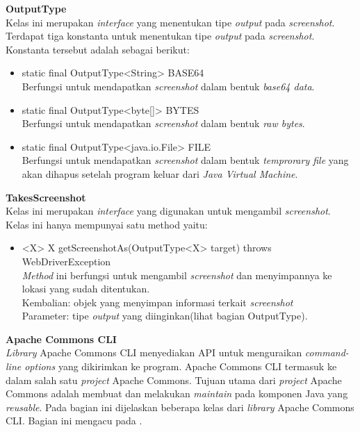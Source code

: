 \documentclass[a4paper,twoside]{article}
\begin{document}
\begin{enumerate}
\textbf{OutputType}\\
Kelas ini merupakan \textit{interface} yang menentukan tipe \textit{output} pada \textit{screenshot}. Terdapat tiga konstanta untuk menentukan tipe \textit{output} pada \textit{screenshot}. Konstanta tersebut adalah sebagai berikut:
\begin{itemize}
\item static final OutputType<String> BASE64\\
Berfungsi untuk mendapatkan \textit{screenshot} dalam bentuk \textit{base64 data}.
\item static final OutputType<byte[]> BYTES\\
Berfungsi untuk mendapatkan \textit{screenshot} dalam bentuk \textit{raw bytes}.
\item static final OutputType<java.io.File> FILE\\
Berfungsi untuk mendapatkan \textit{screenshot} dalam bentuk \textit{temprorary file} yang akan dihapus setelah program keluar dari \textit{Java Virtual Machine}.
\end{itemize}


\textbf{TakesScreenshot}\\
Kelas ini merupakan \textit{interface} yang digunakan untuk mengambil \textit{screenshot}. Kelas ini hanya mempunyai satu method yaitu:
\begin{itemize}
\item <X> X getScreenshotAs(OutputType<X> target) throws WebDriverException\\
\textit{Method} ini berfungsi untuk mengambil \textit{screenshot} dan menyimpannya ke lokasi yang sudah ditentukan.\\
Kembalian: objek yang menyimpan informasi terkait \textit{screenshot} \\
Parameter: tipe \textit{output} yang diinginkan(lihat bagian OutputType).

\end{itemize}

\textbf{Apache Commons CLI}\\
\textit{Library} Apache Commons CLI menyediakan API untuk menguraikan \textit{command-line options} yang dikirimkan ke program\cite{Apache_Commons_CLI}. Apache Commons CLI termasuk ke dalam salah satu \textit{project} Apache Commons. Tujuan utama dari \textit{project} Apache Commons adalah membuat dan melakukan \textit{maintain} pada komponen Java yang \textit{reusable}. Pada bagian ini dijelaskan beberapa kelas dari \textit{library} Apache Commons CLI. Bagian ini mengacu pada \cite{Apache_java_doc}.


\end{enumerate}
\end{document}
